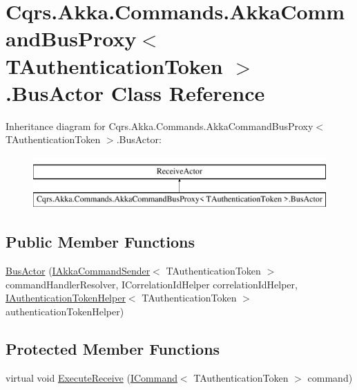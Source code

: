 \hypertarget{classCqrs_1_1Akka_1_1Commands_1_1AkkaCommandBusProxy_1_1BusActor}{}\section{Cqrs.\+Akka.\+Commands.\+Akka\+Command\+Bus\+Proxy$<$ T\+Authentication\+Token $>$.Bus\+Actor Class Reference}
\label{classCqrs_1_1Akka_1_1Commands_1_1AkkaCommandBusProxy_1_1BusActor}
Inheritance diagram for Cqrs.\+Akka.\+Commands.\+Akka\+Command\+Bus\+Proxy$<$ T\+Authentication\+Token $>$.Bus\+Actor\+:\begin{figure}[H]
\begin{center}
\leavevmode
\includegraphics[height=2.000000cm]{classCqrs_1_1Akka_1_1Commands_1_1AkkaCommandBusProxy_1_1BusActor}
\end{center}
\end{figure}
\subsection*{Public Member Functions}
\begin{DoxyCompactItemize}
\item 
\hyperlink{classCqrs_1_1Akka_1_1Commands_1_1AkkaCommandBusProxy_1_1BusActor_a3a91b0c5338c8fbd59bd7e5751ba2f32_a3a91b0c5338c8fbd59bd7e5751ba2f32}{Bus\+Actor} (\hyperlink{interfaceCqrs_1_1Akka_1_1Commands_1_1IAkkaCommandSender}{I\+Akka\+Command\+Sender}$<$ T\+Authentication\+Token $>$ command\+Handler\+Resolver, I\+Correlation\+Id\+Helper correlation\+Id\+Helper, \hyperlink{interfaceCqrs_1_1Authentication_1_1IAuthenticationTokenHelper}{I\+Authentication\+Token\+Helper}$<$ T\+Authentication\+Token $>$ authentication\+Token\+Helper)
\end{DoxyCompactItemize}
\subsection*{Protected Member Functions}
\begin{DoxyCompactItemize}
\item 
virtual void \hyperlink{classCqrs_1_1Akka_1_1Commands_1_1AkkaCommandBusProxy_1_1BusActor_a2218f176012e4074308d8de36f1f48a2_a2218f176012e4074308d8de36f1f48a2}{Execute\+Receive} (\hyperlink{interfaceCqrs_1_1Commands_1_1ICommand}{I\+Command}$<$ T\+Authentication\+Token $>$ command)
\end{DoxyCompactItemize}
